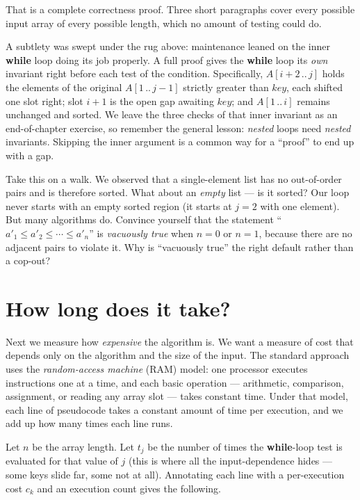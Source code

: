 That is a complete correctness proof. Three
short paragraphs cover every possible input array of every possible length, which no
amount of testing could do.

\begin{trapbox}
A subtlety was swept under the rug above: maintenance leaned on the inner
\textbf{while} loop doing its job properly. A full proof gives the
\textbf{while} loop its \emph{own} invariant right before each test of the
condition. Specifically, $A[i+2\,..\,j]$ holds the elements of the original
$A[1\,..\,j-1]$ strictly greater than $\mathit{key}$, each shifted one slot
right; slot $i+1$ is the open gap awaiting $\mathit{key}$; and $A[1\,..\,i]$
remains unchanged and sorted. We leave the three checks of that inner invariant
as an end-of-chapter exercise, so remember the general lesson: \emph{nested}
loops need \emph{nested} invariants. Skipping the inner argument is a common
way for a ``proof'' to end up with a gap.
\end{trapbox}

\begin{walkbox}
Take this on a walk. We observed that a single-element list has no out-of-order pairs
and is therefore sorted. What about an \emph{empty} list --- is it sorted? Our loop
never starts with an empty sorted region (it starts at $j=2$ with one element). But
many algorithms do. Convince yourself that the statement ``$a'_1 \le a'_2 \le \cdots \le
a'_n$'' is \emph{vacuously true} when $n = 0$ or $n = 1$, because there are no
adjacent pairs to violate it. Why is ``vacuously true'' the right default rather than a
cop-out?
\end{walkbox}

\section{How long does it take?}

Next we measure how \emph{expensive} the algorithm is. We want a measure of cost that
depends only on the algorithm and the size of the input. The standard approach uses the \emph{random-access machine} (RAM) model: one
processor executes instructions one at a time, and each basic operation --- arithmetic,
comparison, assignment, or reading any array slot --- takes constant time. Under that
model, each line of pseudocode takes a constant amount of time per execution, and we add
up how many times each line runs.

Let $n$ be the array length. Let $t_j$ be the number of times the \textbf{while}-loop
test is evaluated for that value of $j$ (this is where all the input-dependence hides
--- some keys slide far, some not at all). Annotating each line with a per-execution
cost $c_k$ and an execution count gives the following.

